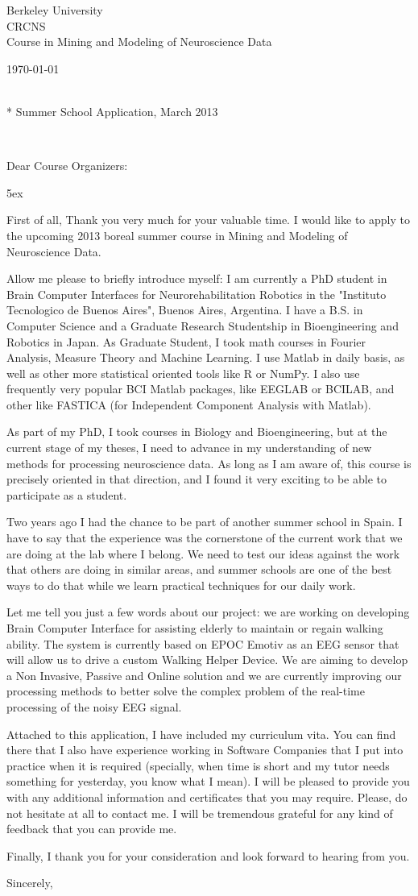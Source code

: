\documentclass[11pt]{letter}
\makeatletter
\def\opening#1{\ifx\@empty\fromaddress
 \thispagestyle{firstpage}
 \hspace*{\longindendation}\today\par
 \else \thispagestyle{empty}
 {\centering\fromaddress \vspace{1.9cm} \\*
 \hspace*{0in}Summer School Application, March 2013\hspace*{\fill}\par}
 \fi
 {\raggedright \toname \\ \toaddress \par}\vspace{2\parskip}
 \noindent #1\par\raggedright\parindent 5ex\par
 }
\makeatother
\begin{document}
\begin{letter}
{Berkeley University\\
CRCNS \\
Course in Mining and Modeling of Neuroscience Data
}

\opening{Dear Course Organizers:}

First of all, Thank you very much for your valuable time.  I would like to apply to the upcoming 2013 boreal summer course in Mining and Modeling of Neuroscience Data.

Allow me please to briefly introduce myself: I am currently a PhD student in Brain Computer Interfaces for  Neurorehabilitation Robotics in the "Instituto Tecnologico de Buenos Aires",  Buenos Aires, Argentina.  I have a B.S. in Computer Science and a Graduate Research Studentship in Bioengineering and Robotics in Japan. As Graduate Student, I took math courses in Fourier Analysis, Measure Theory and Machine Learning.  I use Matlab in daily basis, as well as other more statistical oriented tools like R or NumPy.  I also use frequently very popular BCI Matlab packages, like EEGLAB or BCILAB, and other like FASTICA (for Independent Component Analysis with Matlab).

As part of my PhD, I took courses in Biology and Bioengineering, but at the current stage of my theses, I need to advance in my understanding of new methods for processing neuroscience data.  As long as I am aware of, this course is precisely oriented in that direction, and I found it very exciting to be able to participate as a student. 

Two years ago I had the chance to be part of another summer school in Spain.  I have to say that the experience was the cornerstone of the current work that we are doing at the lab where I belong.  We need to test our ideas against the work that others are doing in similar areas, and summer schools are one of the best ways to do that while we learn practical techniques for our daily work. 

Let me tell you just a few words about our project:  we are working on developing Brain Computer Interface for assisting elderly to maintain or regain walking ability. The system is currently based on EPOC Emotiv as an EEG sensor that will allow us to drive a custom Walking Helper Device.  We are aiming to develop a Non Invasive, Passive and Online solution and we are currently improving our processing methods to better solve the complex problem of the real-time processing of the noisy EEG signal.  

Attached to this application, I have included my curriculum vita.  You can find there that I also have experience working in Software Companies that I put into practice when it is required (specially, when time is short and my tutor needs something for yesterday, you know what I mean).  I will be pleased to provide you with any additional information and certificates that you may require.  Please, do not hesitate at all to contact me.  I will be tremendous grateful for any kind of feedback that you can provide me.

Finally, I thank you for your consideration and look forward to hearing from you.

\closing{Sincerely,}
\end{letter}
\end{document}
